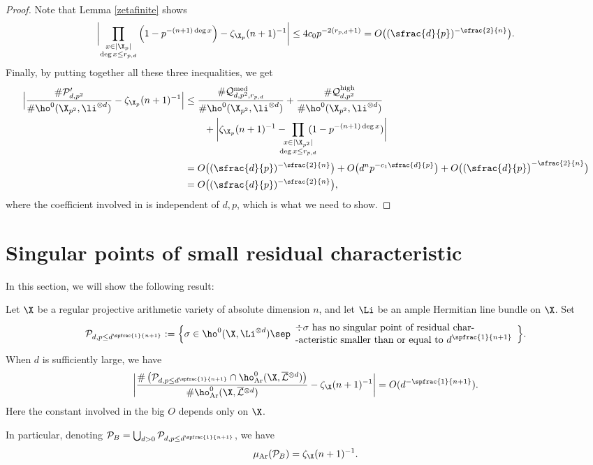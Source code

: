 \begin{proof}
Note that Lemma \ref{zetafinite} shows
\[
\biggl| \prod_{\substack{x\in |\X_{p}|\\ \deg x\leq r_{p,d}}} \left(1-p^{-(n+1)\deg x} \right) - \zeta_{\X_p}(n+1)^{-1} \biggr|\leq 4c_0 p^{-2(r_{p,d}+1)}=O\bigl((\sfrac{d}{p})^{-\sfrac{2}{n}}\bigl).
\]
Finally, by putting together all these three inequalities, we get
\begin{align*}
\Bigl| \frac{\#\mathcal{P}'_{d,p^2}}{\#\ho^0(\X_{p^2}, \li^{\otimes d})}-\zeta_{\X_p}(n+1)^{-1} \Bigr|&\leq \frac{\#\mathcal{Q}^{\mathrm{med}}_{d,p^2,r_{p,d}}}{\#\ho^0(\X_{p^2}, \li^{\otimes d})} +\frac{\#\mathcal{Q}^{\mathrm{high}}_{d,p^2}}{\#\ho^0(\X_{p^2}, \li^{\otimes d})}\\
&\hspace*{7mm}+ \biggl| \zeta_{\X_p}(n+1)^{-1}-\hspace*{-3mm}\prod_{\substack{x\in |\X_{p^2}|\\ \deg x\leq r_{p,d}}}\hspace*{-3mm}(1-p^{-(n+1)\deg x}) \biggr| \\
&= O\bigl((\sfrac{d}{p})^{-\sfrac{2}{n}} \bigr)+O\bigl(d^{n}p^{-c_1\sfrac{d}{p}}\bigr)+O\bigl((\sfrac{d}{p}\bigr)^{-\sfrac{2}{n}}\bigr)\\
&= O\bigl((\sfrac{d}{p})^{-\sfrac{2}{n}}\bigr),
\end{align*}
where the coefficient involved in is independent of $d,p$, which is what we need to show.
\end{proof}

\section{Singular points of small residual characteristic}\label{smallresidual}

In this section, we will show the following result:

\begin{prop}\label{small}
Let $\X$ be a regular projective arithmetic variety of absolute dimension $n$, and let $\Li$ be an ample Hermitian line bundle on $\X$. Set
\[
\mathcal{P}_{d, p\leq d^{\spfrac{1}{n+1}}}:=\Bigl\{ \sigma\in \ho^0(\X,\Li^{\otimes d})\sep \begin{array}{ll}
\div \sigma \text{ has no singular point of residual char-} \\
\text{-acteristic smaller than or equal to } d^{\spfrac{1}{n+1}}
\end{array}\Bigr\}.
\]
When $d$ is sufficiently large, we have
\[
\biggl| \frac{\#\left(\mathcal{P}_{d, p\leq d^{\spfrac{1}{n+1}}}\cap \ho^0_{\mathrm{Ar}}(\X, \overline{\mathcal{L}}{}^{\otimes d})\right)}{\#\ho^0_{\mathrm{Ar}}(\X, \overline{\mathcal{L}}{}^{\otimes d})} -\zeta_\X(n+1)^{-1} \biggr| = O(d^{-\spfrac{1}{n+1}}).
\]
Here the constant involved in the big $O$ depends only on $\X$.

In particular, denoting $\mathcal{P}_B=\bigcup_{d>0}\mathcal{P}_{d, p\leq d^{\spfrac{1}{n+1}}}$, we have
\[
\mu_{\mathrm{Ar}}(\mathcal{P}_B)=\zeta_\X(n+1)^{-1}.
\]
\end{prop}

